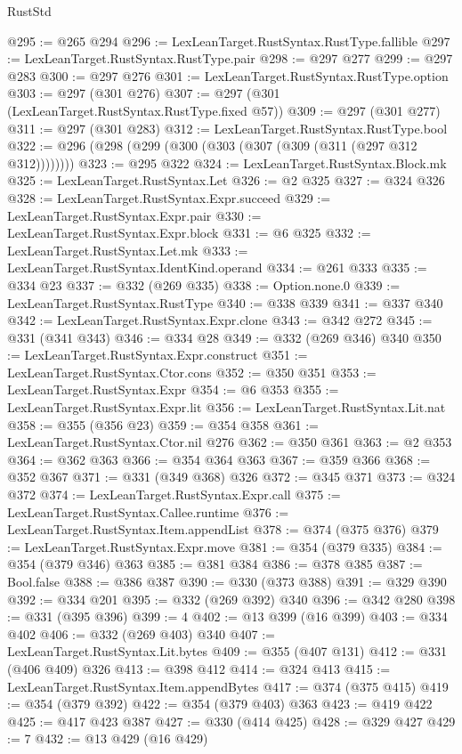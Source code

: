 \begin{lexlean}{RustStd}
\begin{coremodule}
@295 := @265 @294
@296 := LexLeanTarget.RustSyntax.RustType.fallible
@297 := LexLeanTarget.RustSyntax.RustType.pair
@298 := @297 @277
@299 := @297 @283
@300 := @297 @276
@301 := LexLeanTarget.RustSyntax.RustType.option
@303 := @297 (@301 @276)
@307 := @297 (@301 (LexLeanTarget.RustSyntax.RustType.fixed @57))
@309 := @297 (@301 @277)
@311 := @297 (@301 @283)
@312 := LexLeanTarget.RustSyntax.RustType.bool
@322 := @296 (@298 (@299 (@300 (@303 (@307 (@309 (@311 (@297 @312 @312))))))))
@323 := @295 @322
@324 := LexLeanTarget.RustSyntax.Block.mk
@325 := LexLeanTarget.RustSyntax.Let
@326 := @2 @325
@327 := @324 @326
@328 := LexLeanTarget.RustSyntax.Expr.succeed
@329 := LexLeanTarget.RustSyntax.Expr.pair
@330 := LexLeanTarget.RustSyntax.Expr.block
@331 := @6 @325
@332 := LexLeanTarget.RustSyntax.Let.mk
@333 := LexLeanTarget.RustSyntax.IdentKind.operand
@334 := @261 @333
@335 := @334 @23
@337 := @332 (@269 @335)
@338 := Option.none.{0}
@339 := LexLeanTarget.RustSyntax.RustType
@340 := @338 @339
@341 := @337 @340
@342 := LexLeanTarget.RustSyntax.Expr.clone
@343 := @342 @272
@345 := @331 (@341 @343)
@346 := @334 @28
@349 := @332 (@269 @346) @340
@350 := LexLeanTarget.RustSyntax.Expr.construct
@351 := LexLeanTarget.RustSyntax.Ctor.cons
@352 := @350 @351
@353 := LexLeanTarget.RustSyntax.Expr
@354 := @6 @353
@355 := LexLeanTarget.RustSyntax.Expr.lit
@356 := LexLeanTarget.RustSyntax.Lit.nat
@358 := @355 (@356 @23)
@359 := @354 @358
@361 := LexLeanTarget.RustSyntax.Ctor.nil @276
@362 := @350 @361
@363 := @2 @353
@364 := @362 @363
@366 := @354 @364 @363
@367 := @359 @366
@368 := @352 @367
@371 := @331 (@349 @368) @326
@372 := @345 @371
@373 := @324 @372
@374 := LexLeanTarget.RustSyntax.Expr.call
@375 := LexLeanTarget.RustSyntax.Callee.runtime
@376 := LexLeanTarget.RustSyntax.Item.appendList
@378 := @374 (@375 @376)
@379 := LexLeanTarget.RustSyntax.Expr.move
@381 := @354 (@379 @335)
@384 := @354 (@379 @346) @363
@385 := @381 @384
@386 := @378 @385
@387 := Bool.false
@388 := @386 @387
@390 := @330 (@373 @388)
@391 := @329 @390
@392 := @334 @201
@395 := @332 (@269 @392) @340
@396 := @342 @280
@398 := @331 (@395 @396)
@399 := 4
@402 := @13 @399 (@16 @399)
@403 := @334 @402
@406 := @332 (@269 @403) @340
@407 := LexLeanTarget.RustSyntax.Lit.bytes
@409 := @355 (@407 @131)
@412 := @331 (@406 @409) @326
@413 := @398 @412
@414 := @324 @413
@415 := LexLeanTarget.RustSyntax.Item.appendBytes
@417 := @374 (@375 @415)
@419 := @354 (@379 @392)
@422 := @354 (@379 @403) @363
@423 := @419 @422
@425 := @417 @423 @387
@427 := @330 (@414 @425)
@428 := @329 @427
@429 := 7
@432 := @13 @429 (@16 @429)

\end{coremodule}
\end{lexlean}
